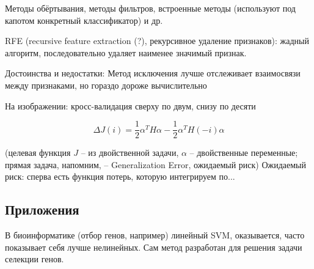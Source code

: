 \documentclass[main.tex]{subfiles}
\begin{document}
Методы обёртывания, методы фильтров, встроенные методы (используют под капотом конкретный классификатор) и др.

RFE (recursive feature extraction (?), рекурсивное удаление признаков): жадный алгоритм, последовательно удаляет наименее значимый признак.

Достоинства и недостатки:
Метод исключения лучше отслеживает взаимосвязи между признаками, но гораздо дороже вычислительно

На изображении: кросс-валидация сверху по двум, снизу по десяти

\[ \Delta J(i) = \frac{1}{2} \alpha^T H \alpha - \frac{1}{2} \alpha^T H(-i) \alpha \]

(целевая функция $ J $ -- из двойственной задачи, $ \alpha $ -- двойственные переменные; прямая задача, напомним, -- Generalization Error, ожидаемый риск)
Ожидаемый риск: сперва есть функция потерь, которую интегрируем по...

\subsection{Приложения}

В биоинформатике (отбор генов, например) линейный SVM, оказывается, часто показывает себя лучше нелинейных.
Сам метод разработан для решения задачи селекции генов.
\end{document}
